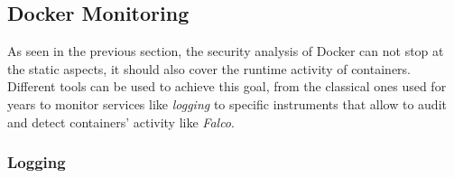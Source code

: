 \documentclass[a4paper,12pt]{article}
\begin{document}
\subsection{Docker Monitoring}

As seen in the previous section, the security analysis of Docker can not stop at
the static aspects, it should also cover the runtime activity of containers.
Different tools can be used to achieve this goal, from the classical ones used
for years to monitor services like \textit{logging} to specific instruments that
allow to audit and detect containers' activity like \textit{Falco}.

\subsubsection{Logging}
\end{document}
